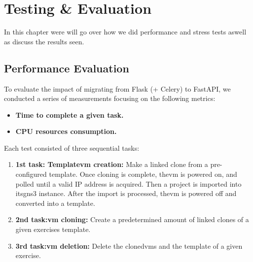
\chapter{Testing \& Evaluation}


\label{Chapter6TestingEvaluation}

In this chapter were will go over how we did performance and stress tests aswell as discuss the results seen.

\section{Performance Evaluation}

    To evaluate the impact of migrating from Flask (+ Celery) to FastAPI, we conducted a series of measurements 
    focusing on the following metrics:

    \begin{itemize}
        \item \textbf{Time to complete a given task.}
        \item \textbf{CPU resources consumption.}
    \end{itemize}

    Each test consisted of three sequential tasks:

    \begin{enumerate}
        \item \textbf{1st task: Template\ac{vm} creation:} Make a linked clone from a pre-configured template. Once 
        cloning is complete, the\ac{vm} is powered on, and polled until a valid IP address is acquired. Then a 
        project is imported into its\ac{gns3} instance. After the import is processed, the\ac{vm} is powered off 
        and converted into a template.

        \item \textbf{2nd task:\ac{vm} cloning:} Create a predetermined amount of linked clones of a given exercises 
        template.

        \item \textbf{3rd task:\ac{vm} deletion:} Delete the cloned\ac{vm}s and the template of a given exercise.
    \end{enumerate}


